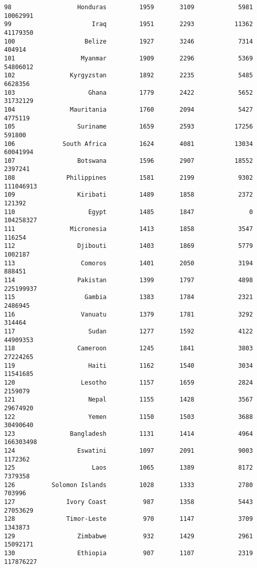\documentclass[
]{article}
\begin{document}
\begin{verbatim}
98                  Honduras         1959       3109            5981   10062991
99                      Iraq         1951       2293           11362   41179350
100                   Belize         1927       3246            7314     404914
101                  Myanmar         1909       2296            5369   54806012
102               Kyrgyzstan         1892       2235            5485    6628356
103                    Ghana         1779       2422            5652   31732129
104               Mauritania         1760       2094            5427    4775119
105                 Suriname         1659       2593           17256     591800
106             South Africa         1624       4081           13034   60041994
107                 Botswana         1596       2907           18552    2397241
108              Philippines         1581       2199            9302  111046913
109                 Kiribati         1489       1858            2372     121392
110                    Egypt         1485       1847               0  104258327
111               Micronesia         1413       1858            3547     116254
112                 Djibouti         1403       1869            5779    1002187
113                  Comoros         1401       2050            3194     888451
114                 Pakistan         1399       1797            4898  225199937
115                   Gambia         1383       1784            2321    2486945
116                  Vanuatu         1379       1781            3292     314464
117                    Sudan         1277       1592            4122   44909353
118                 Cameroon         1245       1841            3803   27224265
119                    Haiti         1162       1540            3034   11541685
120                  Lesotho         1157       1659            2824    2159079
121                    Nepal         1155       1428            3567   29674920
122                    Yemen         1150       1503            3688   30490640
123               Bangladesh         1131       1414            4964  166303498
124                 Eswatini         1097       2091            9003    1172362
125                     Laos         1065       1389            8172    7379358
126          Solomon Islands         1028       1333            2780     703996
127              Ivory Coast          987       1358            5443   27053629
128              Timor-Leste          970       1147            3709    1343873
129                 Zimbabwe          932       1429            2961   15092171
130                 Ethiopia          907       1107            2319  117876227

\end{verbatim}
\end{document}
